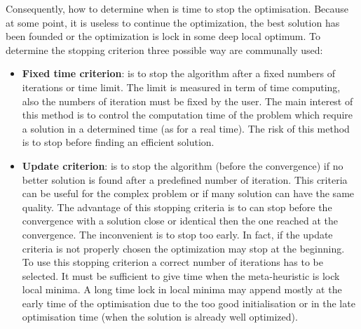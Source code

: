 Consequently, how to determine when is time to stop the optimisation. Because at some point, it is useless to continue the optimization, the best solution has been founded or the optimization is lock in some deep local optimum.%
 To determine the stopping criterion three possible way are communally used:\\
\begin{itemize}
\item  \textbf{Fixed time criterion}: is to stop the algorithm after a fixed numbers of iterations or time limit. The limit is measured in term of time computing, also the numbers of iteration must be fixed by the user. The main interest of this method is to control the computation time of the problem which require a solution in a determined time (as for a real time). The risk of this method is to stop before finding an efficient solution. \\

\item \textbf{Update criterion}: is to stop the algorithm (before the convergence) if no better solution is found after a predefined number of iteration. This criteria can be useful for the complex problem or if many solution can have the same quality. 
The advantage of this stopping criteria is to can stop before the convergence with a solution close or identical then the one reached at the convergence. 
The inconvenient is to stop too early. In fact, if the update criteria is not properly chosen the optimization  may stop at the beginning.   \\
To use this stopping criterion a correct number of iterations has to  be selected. 
It must be sufficient to give time when the meta-heuristic is lock local minima. 
A long time lock in local minima may append mostly at the early time of the optimisation due to the too good initialisation or in the late optimisation time (when the solution is already well optimized).\\


\end{itemize}
